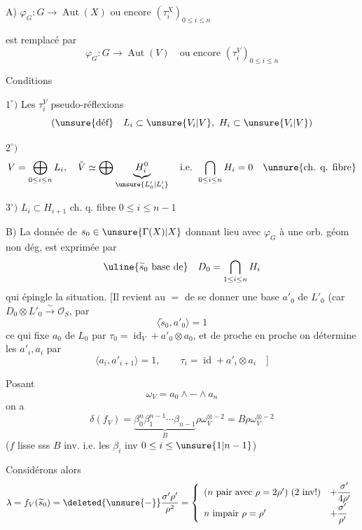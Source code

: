 A) $\varphi_G:G\longrightarrow\operatorname{Aut}(X)$
ou encore $(\tau_i^X)_{0\leq i\leq n}$

est remplacé par
\[
\varphi_G:G\longrightarrow\operatorname{Aut}(V)
\quad\text{ou encore }(\tau_i^V)_{0\leq i\leq n}
\]

Conditions

$1^\circ)$ Les $\tau_i^V$ pseudo-réflexions
\[
(\text{\unsure{déf}} \quad L_i\subset\unsure{V_i|V},\ H_i\subset\unsure{V_i|V})
\]


$2^\circ)$
\[
V=\bigoplus_{0\leq i\leq n}L_i,\quad
\check V\simeq\bigoplus\underbrace{H_i^0}_{\unsure{L'_0|L'_i}}
\quad\text{i.e. }\bigcap_{0\leq i\leq n}H_i=0
\quad\text{\unsure{ch. q. fibre}}
\]

$3^\circ)$ $L_i\subset H_{i+1}$ ch. q. fibre
\hfill$0\leq i\leq n-1$


B) La donnée de $s_0\in\unsure{\Gamma(X)|X}$
\deleted{$\mathbin{-}$}
donnant lieu avec $\varphi_G$ à une orb. géom non dég,
est  exprimée par
\[
\uline{\widetilde s_0\text{ base de}}\quad
D_0=\bigcap_{1\leq i\leq n}H_i
\]
qui épingle la situation.
[Il revient au $=$ de se donner une base
$a'_0$ de $L'_0$ (car $D_0\otimes L'_0\xrightarrow{\sim}\mathcal O_S$, par
\[
\boxed{\langle\widetilde s_0,a'_0\rangle=1}
\]
ce qui fixe  $a_0$ de $L_0$ par
$\tau_0=\operatorname{id}_V+a'_0\otimes a_0$,
et de proche en proche on détermine les $a'_i,a_i$ par
\[
\langle a_i,a'_{i+1}\rangle=1,\qquad
\tau_i=\operatorname{id}+a'_i\otimes a_i
\quad]
\]

Posant
\[
\omega_V=a_0\wedge\mathbin{-}\wedge a_n
\]
on a
\[
\delta(f_V)
=\underbrace{\beta_0^n\beta_1^{n-1}\cdots\beta_{n-1}}_B
\rho\omega_V^{\otimes-2}
=B\rho\omega_V^{\otimes-2}
\]
($f$ lisse sss $B$ inv. i.e. les $\beta_i$ inv
\quad$0\leq i\leq\unsure{1|n-1}$)

Considérons alors
\[
\lambda=f_V(\widetilde s_0)
=\deleted{\unsure{-}}\frac{\sigma'\rho'}{\rho^2}
=\left\{\begin{array}{ll}
(n\text{ pair avec }\rho=2\rho')\ (2\text{ inv!})
&+\dfrac{\sigma'}{4\rho'}\\
n\text{ impair }\rho=\rho'
&+\dfrac{\sigma'}{\rho'}
\end{array}\right.
\]

